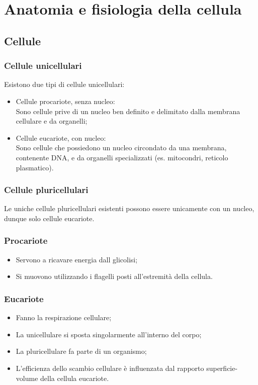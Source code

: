 \documentclass{article}
\begin{document}
\newpage
\section{Anatomia e fisiologia della cellula}
\subsection{Cellule}
\subsubsection{Cellule unicellulari}
Esistono due tipi di cellule unicellulari:
\begin{itemize}
    \item Cellule procariote, senza nucleo:\\
        Sono cellule prive di un nucleo ben definito e delimitato dalla membrana cellulare e
        da organelli;
    \item Cellule eucariote, con nucleo:\\
        Sono cellule che possiedono un nucleo circondato da una membrana, contenente DNA, e da
        organelli specializzati (es. mitocondri, reticolo plasmatico). 
\end{itemize}

\subsubsection{Cellule pluricellulari}
Le uniche cellule pluricellulari esistenti possono essere unicamente con un nucleo, dunque
solo cellule eucariote.

\subsubsection{Procariote}
\begin{itemize}
    \item Servono a ricavare energia dall glicolisi;
    \item Si muovono utilizzando i flagelli posti all'estremità della cellula.
\end{itemize}

\subsubsection{Eucariote}
\begin{itemize}
    \item Fanno la respirazione cellulare;
    \item La unicellulare si sposta singolarmente all'interno del corpo;
    \item La pluricellulare fa parte di un organismo;
    \item L'efficienza dello scambio cellulare è influenzata dal rapporto superficie-volume
        della cellula eucariote.
\end{itemize}
\end{document}
